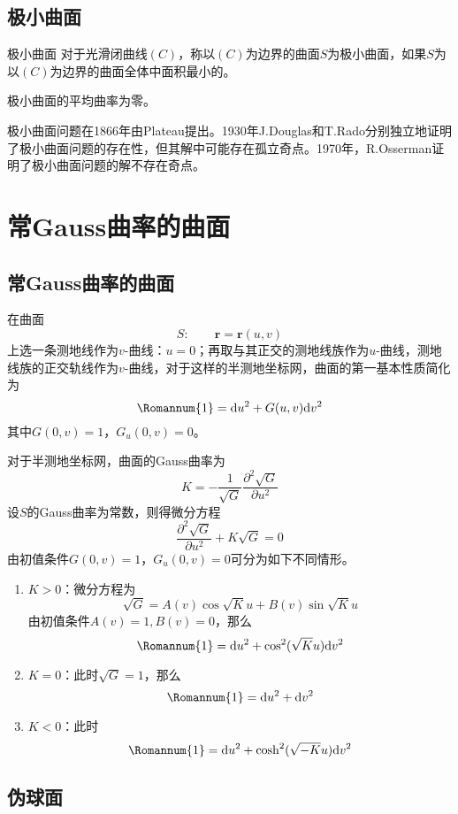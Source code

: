 \documentclass[lang = cn, scheme = chinese, thmcnt = section]{elegantbook}
\newcommand{\bs}{\boldsymbol}          %
\newcommand{\dd}{\mathrm{d}}           %
\begin{document}
\subsection{极小曲面}

\begin{definition}{极小曲面}
	对于光滑闭曲线$(C)$，称以$(C)$为边界的曲面$S$为极小曲面，如果$S$为以$(C)$为边界的曲面全体中面积最小的。
\end{definition}

\begin{theorem}
	极小曲面的平均曲率为零。
\end{theorem}

极小曲面问题在1866年由Plateau提出。1930年J.Douglas和T.Rado分别独立地证明了极小曲面问题的存在性，但其解中可能存在孤立奇点。1970年，R.Osserman证明了极小曲面问题的解不存在奇点。

\section{常Gauss曲率的曲面}

\subsection{常Gauss曲率的曲面}

在曲面%
$$
S:\qquad
\bs{r}=\bs{r}(u,v)
$$
上选一条测地线作为$v$-曲线：$u=0$；再取与其正交的测地线族作为$u$-曲线，测地线族的正交轨线作为$v$-曲线，对于这样的半测地坐标网，曲面的第一基本性质简化为%
$$
{\rm\Romannum{1}}
=\dd u^2+ G(u,v)\dd v^2
$$
其中$G(0,v)=1$，$G_u(0,v)=0$。

对于半测地坐标网，曲面的Gauss曲率为%
$$
K=-\frac{1}{\sqrt{G}}\frac{\partial^2 \sqrt{G}}{\partial u^2}
$$
设$S$的Gauss曲率为常数，则得微分方程%
$$
\frac{\partial^2\sqrt{G}}{\partial u^2}+K\sqrt{G}=0
$$
由初值条件$G(0,v)=1$，$G_u(0,v)=0$可分为如下不同情形。

\begin{enumerate}
	\item $K>0$：微分方程为%
	$$
	\sqrt{G}=A(v)\cos\sqrt{K}u+B(v)\sin\sqrt{K}u
	$$
	由初值条件$A(v)=1,B(v)=0$，那么
	$$
	{\rm\Romannum{1}}
	=\dd u^2+ \cos^2(\sqrt{K}u)\dd v^2
	$$
	\item $K=0$：此时$\sqrt{G}=1$，那么
	$$
	{\rm\Romannum{1}}
	=\dd u^2+ \dd v^2
	$$
	\item $K<0$：此时
	$$
	{\rm\Romannum{1}}
	=\dd u^2+ \cosh^2(\sqrt{-K}u)\dd v^2
	$$
\end{enumerate}

\subsection{伪球面}
\end{document}
